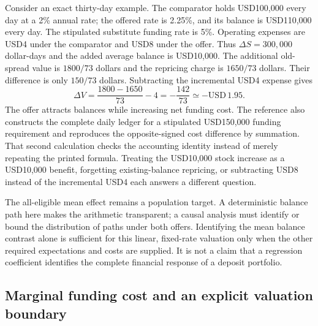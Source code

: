 Consider an exact thirty-day example. The comparator holds USD100,000 every
day at a 2\% annual rate; the offered rate is 2.25\%, and its balance is
USD110,000 every day. The stipulated substitute funding rate is 5\%.
Operating expenses are USD4 under the comparator and USD8 under the offer.
Thus $\Delta S=300{,}000$ dollar-days and the added average balance is
USD10,000. The additional old-spread value is $1800/73$ dollars and the
repricing charge is $1650/73$ dollars. Their difference is only $150/73$
dollars. Subtracting the incremental USD4 expense gives
\begin{equation}
 \Delta V=\frac{1800-1650}{73}-4=-\frac{142}{73}
          \simeq -\mathrm{USD}\,1.95.
 \label{exec17:l2-numeric}
\end{equation}
The offer attracts balances while increasing net funding cost. The reference
also constructs the complete daily ledger for a stipulated USD150,000 funding
requirement and reproduces the opposite-signed cost difference by summation.
That second calculation checks the accounting identity instead of merely
repeating the printed formula. Treating the USD10,000 stock increase as a
USD10,000 benefit, forgetting existing-balance repricing, or subtracting
USD8 instead of the incremental USD4 each answers a different question.

The all-eligible mean effect remains a population target. A deterministic
balance path here makes the arithmetic transparent; a causal analysis must
identify or bound the distribution of paths under both offers. Identifying
the mean balance contrast alone is sufficient for this linear, fixed-rate
valuation only when the other required expectations and costs are supplied.
It is not a claim that a regression coefficient identifies the complete
financial response of a deposit portfolio.

\subsection{Marginal funding cost and an explicit valuation boundary}

